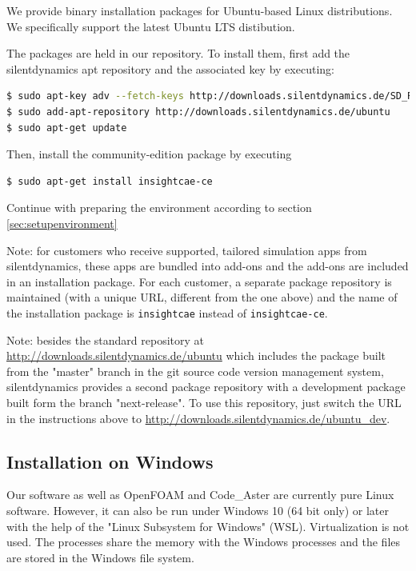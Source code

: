 We provide binary installation packages for Ubuntu-based Linux distributions. We specifically support the latest Ubuntu LTS distibution.

The packages are held in our repository. To install them, first add the silentdynamics apt repository and the associated key by executing:

\begin{lstlisting}[language=bash]
$ sudo apt-key adv --fetch-keys http://downloads.silentdynamics.de/SD_REPOSITORIES_PUBLIC_KEY.gpg
$ sudo add-apt-repository http://downloads.silentdynamics.de/ubuntu
$ sudo apt-get update
\end{lstlisting}

Then, install the community-edition package by executing

\begin{lstlisting}[language=bash]
$ sudo apt-get install insightcae-ce
\end{lstlisting}

Continue with preparing the environment according to section \ref{sec:setupenvironment}

Note: for customers who receive supported, tailored simulation apps from silentdynamics, these apps are bundled into add-ons and the add-ons are included in an installation package.
For each customer, a separate package repository is maintained (with a unique URL, different from the one above) and the name of the installation package is \texttt{insightcae} instead of \texttt{insightcae-ce}.

Note: besides the standard repository at \url{http://downloads.silentdynamics.de/ubuntu} which includes the package built from the "master" branch in the git source code version management system, silentdynamics provides a second package repository with a development package built form the branch "next-release".
To use this repository, just switch the URL in the instructions above to
\url{http://downloads.silentdynamics.de/ubuntu_dev}.

\subsection{Installation on Windows}
Our software as well as OpenFOAM and Code\_Aster are currently pure Linux software. 
However, it can also be run under Windows 10 (64 bit only) or later with the help of the "Linux Subsystem for Windows" (WSL).
Virtualization is not used. 
The processes share the memory with the Windows processes and the files are stored in the Windows file system. 

